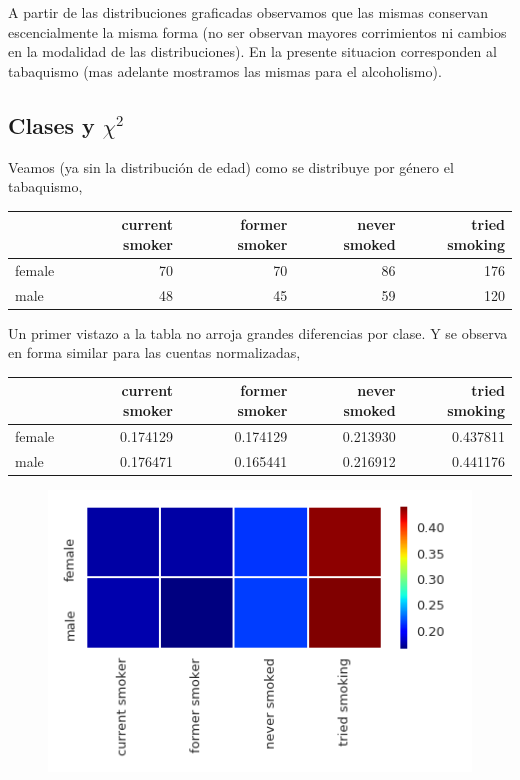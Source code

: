 \documentclass[8pt]{beamer}
\begin{document}
\begin{frame}
\begin{multicols}{2}
\begin{figure}
 \end{figure}
\end{multicols}
\vspace{-0.5cm}\small{
A partir de las distribuciones graficadas observamos que las mismas conservan escencialmente la misma forma (no ser observan mayores corrimientos ni cambios en la modalidad de las distribuciones). En la presente situacion corresponden al tabaquismo (mas adelante mostramos las mismas para el alcoholismo).
}
\end{frame}

\subsection{Clases y $\chi^2$ }
\begin{frame}
Veamos (ya sin la distribución de edad) como se distribuye por género el tabaquismo, 
\tiny{
\begin{table}
\begin{tabular}{lrrrr}
\toprule
{} &  current smoker &  former smoker &  never smoked &  tried smoking \\
\midrule
female &              70 &             70 &            86 &            176 \\
male   &              48 &             45 &            59 &            120 \\
\bottomrule
\end{tabular}
\end{table}
} 
\small{Un primer vistazo a la tabla no arroja grandes diferencias por clase. Y se observa en forma similar para las cuentas normalizadas,}
\tiny{
\begin{table}
\begin{tabular}{lrrrr}
\toprule
{} &  current smoker &  former smoker &  never smoked &  tried smoking \\
\midrule
female &        0.174129 &       0.174129 &      0.213930 &       0.437811 \\
male   &        0.176471 &       0.165441 &      0.216912 &       0.441176 \\
\bottomrule
\end{tabular}
\end{table} 
}
\begin{multicols}{2}
  \begin{figure}
 \includegraphics[scale=0.3]{smoking_heatmap}

\end{figure}
\end{multicols}
\end{frame}
\end{document}

